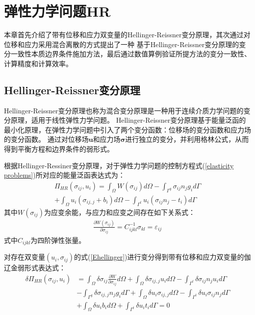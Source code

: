 \chapter{弹性力学问题HR}
本章首先介绍了带有位移和应力双变量的Hellinger-Reissner变分原理，其次通过对位移和应力采用混合离散的方式提出了一种
基于Hellinger-Reissner变分原理的变分一致性本质边界条件施加方法，最后通过数值算例验证所提方法的变分一致性、计算精度和计算效率。
\section{Hellinger-Reissner变分原理}
Hellinger-Reissner变分原理也称为混合变分原理是一种用于连续介质力学问题的变分原理，适用于线性弹性力学问题。
Hellinger-Reissner变分原理基于能量泛函的最小化原理，在弹性力学问题中引入了两个变分函数：位移场的变分函数和应力场的变分函数。
通过对位移场$\pmb{u}$和应力场$\pmb{\sigma}$进行独立的变分，并利用格林公式，从而得到平衡方程和边界条件的弱形式。\par
根据Hellinger-Ressiner变分原理\cite{}，对于弹性力学问题的控制方程式(\ref{elasticity problems})所对应的能量泛函表达式为：
\begin{equation}
\begin{split}\label{Ehellinger}
    \Pi_{H\!R}(\sigma_{ij},u_i)=\int_{\Omega}W(\sigma_{ij})d\Omega-\int_{\Gamma^g}\sigma_{ij}n_jg_id\Gamma\\
    +\int_{\Omega}u_i(\sigma_{ij,j}+b_i)d\Omega-\int_{\Gamma^t}u_i(\sigma_{ij} n_j-t_i)d\Gamma
\end{split}
\end{equation}
其中$W(\sigma_{ij})$为应变余能，与应力和应变之间存在如下关系式：
\begin{equation}
\begin{split}
\frac{\partial W(\sigma_{ij})}{\partial\sigma_{ij}}=C^{-1}_{ijkl}\sigma_{kl}=\varepsilon_{ij}
\end{split}
\end{equation}
式中$C_{ijkl}$为四阶弹性张量。\par
对存在双变量$(u_i,\sigma_{ij})$的式(\ref{Ehellinger})进行变分得到带有位移和应力双变量的伽辽金弱形式表达式：
\begin{equation}\label{weak form1}
\begin{split} 
    \delta\Pi_{H\!R}(\sigma_{ij},u_i)&=\int_{\Omega}\delta\sigma_{ij}\frac{\partial W}{\partial \sigma_{ij}}d\Omega+\int_{\Omega}\delta\sigma_{ij,j}u_id\Omega-\int_{\Gamma^t}\delta\sigma_{ij}n_ju_id\Gamma\\
    &-\int_{\Gamma^g}\delta\sigma_{ij,j}n_jg_id\Gamma+\int_{\Omega}\delta u_i\sigma_{ij,j}d\Omega- \int_{\Gamma^t}\delta u_i\sigma_{ij}n_jd\Gamma\\
    &+\int_{\Omega}\delta u_ib_id\Omega+\int_{\Gamma^t}\delta u_it_id\Gamma=0
\end{split}
\end{equation}\par
